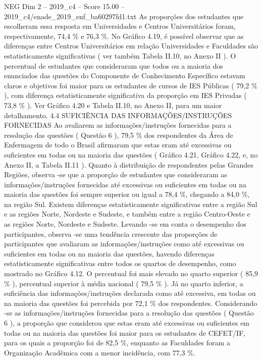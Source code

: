 \begin{textsample}{NEG Dim 2 – 2019\_c4 – Score 15.00 – 2019\_c4/enade\_2019\_enf\_ba60297fd1.txt}
As proporções dos estudantes que escolheram essa resposta em Universidades e Centros Universitários foram, respectivamente, 74,4 \% e 76,3 \%.
No Gráfico 4.19, é possível observar que as diferenças entre Centros Universitários em relação Universidades e Faculdades são estatisticamente significativas ( ver também Tabela II.10, no Anexo II ).
O percentual de estudantes que consideraram que todos ou a maioria dos enunciados das questões do Componente de Conhecimento Específico estavam claros e objetivos foi maior para os estudantes de cursos de IES Públicas ( 79,2 \% ), com diferença estatisticamente significativa da proporção em IES Privadas ( 73,8 \% ).
Ver Gráfico 4.20 e Tabela II.10, no Anexo II, para um maior detalhamento. 4.4 SUFICIÊNCIA DAS INFORMAÇÕES/INSTRUÇÕES FORNECIDAS Ao avaliarem as informações/instruções fornecidas para a resolução das questões ( Questão 6 ), 79,5 \% dos respondentes da Área de Enfermagem de todo o Brasil afirmaram que estas eram até excessivas ou suficientes em todas ou na maioria das questões ( Gráfico 4.21, Gráfico 4.22, e, no Anexo II, a Tabela II.11 ).
Quanto à distribuição de respondentes pelas Grandes Regiões, observa -se que a proporção de estudantes que consideraram as informações/instruções fornecidas até excessivas ou suficientes em todas ou na maioria das questões foi sempre superior ou igual a 78,4 \%, chegando a 84,0 \%, na região Sul.
Existem diferenças estatisticamente significativas entre a região Sul e as regiões Norte, Nordeste e Sudeste, e também entre a região Centro-Oeste e as regiões Norte, Nordeste e Sudeste.
Levando -se em conta o desempenho dos participantes, observa -se uma tendência crescente das proporções de participantes que avaliaram as informações/instruções como até excessivas ou suficientes em todas ou na maioria das questões, havendo diferenças estatisticamente significativas entre todos os quartos de desempenho, como mostrado no Gráfico 4.12.
O percentual foi mais elevado no quarto superior ( 85,9 \% ), percentual superior à média nacional ( 79,5 \% ).
Já no quarto inferior, a suficiência das informações/instruções declarada como até excessiva, em todas ou na maioria das questões foi percebida por 72,1 \% dos respondentes.
Considerando -se as informações/instruções fornecidas para a resolução das questões ( Questão 6 ), a proporção que considerou que estas eram até excessivas ou suficientes em todas ou na maioria das questões foi maior para os estudantes de CEFET/IF, para os quais a proporção foi de 82,5 \%, enquanto as Faculdades foram a Organização Acadêmica com a menor incidência, com 77,3 \%.

\end{textsample}
